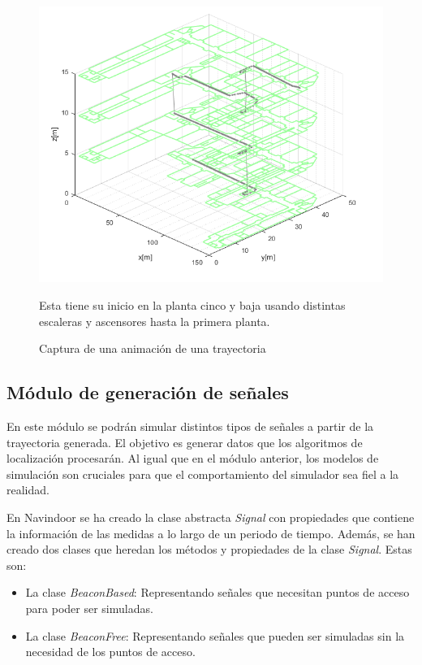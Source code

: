 \begin{figure}
    \centering
    \includegraphics[width=0.8\columnwidth]{img/Design/untitled.png}
    \caption[]{Captura de una animación de una trayectoria}
    \label{fig:animation}
    \small
    Esta tiene su inicio en la planta cinco y baja usando distintas escaleras y ascensores hasta la primera planta.
\end{figure}


\subsection{Módulo de generación de señales}

En este módulo se podrán simular distintos tipos de señales a partir de la trayectoria generada. El objetivo es generar datos que los algoritmos de localización procesarán. Al igual que en el módulo anterior, los modelos de simulación son cruciales para que el comportamiento del simulador sea fiel a la realidad. 

En Navindoor se ha creado la clase abstracta \emph{Signal} con propiedades que contiene la información de las medidas a lo largo de un periodo de tiempo. Además, se han creado dos clases que heredan los métodos y propiedades de la clase \emph{Signal}. Estas son:
\begin{itemize}
    \item La clase \emph{BeaconBased}: Representando señales que necesitan  puntos de acceso para poder ser simuladas. 
    \item La clase \emph{BeaconFree}: Representando señales que pueden ser simuladas sin la necesidad de los puntos de acceso.
   \end{itemize}

